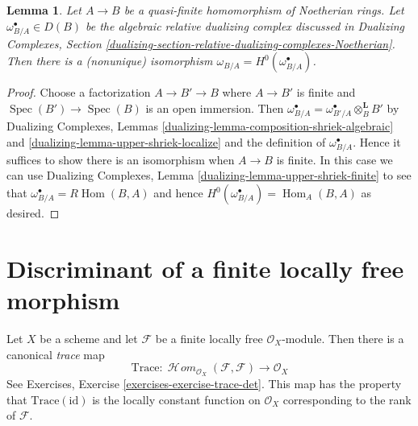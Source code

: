 \documentclass{stacks-project}
\theoremstyle{plain}
\newtheorem{lemma}[subsection]{Lemma}
\theoremstyle{definition}
\theoremstyle{remark}
\numberwithin{equation}{subsection}
\def\Spec{\mathop{\mathrm{Spec}}}
\def\Hom{\mathop{\mathrm{Hom}}\nolimits}
\def\SheafHom{\mathop{\mathcal{H}\!\mathit{om}}\nolimits}
\begin{document}
\begin{lemma}
\label{lemma-compare-dualizing-algebraic}
Let $A \to B$ be a quasi-finite homomorphism of Noetherian rings.
Let $\omega_{B/A}^\bullet \in D(B)$ be the algebraic relative dualizing
complex discussed in Dualizing Complexes, Section
\ref{dualizing-section-relative-dualizing-complexes-Noetherian}.
Then there is a (nonunique) isomorphism
$\omega_{B/A} = H^0(\omega_{B/A}^\bullet)$.
\end{lemma}

\begin{proof}
Choose a factorization $A \to B' \to B$
where $A \to B'$ is finite and $\Spec(B') \to \Spec(B)$
is an open immersion. Then
$\omega_{B/A}^\bullet = \omega_{B'/A}^\bullet \otimes_B^\mathbf{L} B'$
by Dualizing Complexes, Lemmas
\ref{dualizing-lemma-composition-shriek-algebraic} and
\ref{dualizing-lemma-upper-shriek-localize} and
the definition of $\omega_{B/A}^\bullet$. Hence
it suffices to show there is an isomorphism when $A \to B$ is finite.
In this case we can use
Dualizing Complexes, Lemma \ref{dualizing-lemma-upper-shriek-finite}
to see that $\omega_{B/A}^\bullet = R\Hom(B, A)$ and hence
$H^0(\omega^\bullet_{B/A}) = \Hom_A(B, A)$ as desired.
\end{proof}






\section{Discriminant of a finite locally free morphism}
\label{section-discriminant}

\noindent
Let $X$ be a scheme and let $\mathcal{F}$ be a finite locally
free $\mathcal{O}_X$-module. Then there is a canonical {\it trace} map
$$
\text{Trace} :
\SheafHom_{\mathcal{O}_X}(\mathcal{F}, \mathcal{F})
\longrightarrow
\mathcal{O}_X
$$
See Exercises, Exercise \ref{exercises-exercise-trace-det}. This map has
the property that $\text{Trace}(\text{id})$ is the locally constant function
on $\mathcal{O}_X$ corresponding to the rank of $\mathcal{F}$.
\end{document}
